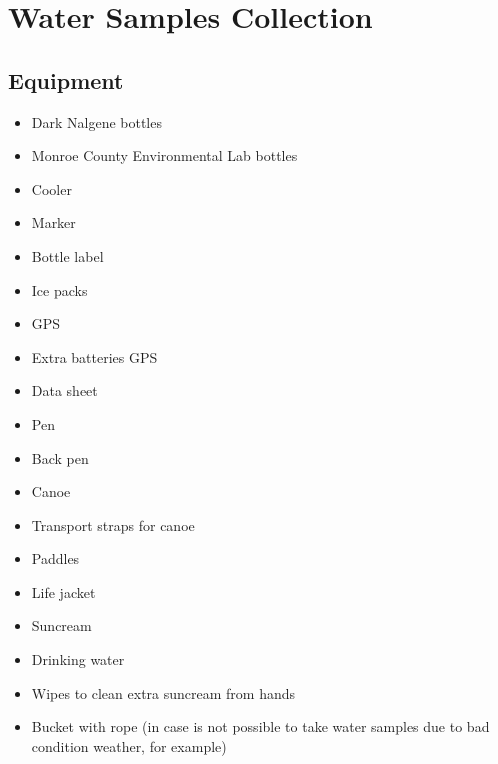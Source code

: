 \documentclass[]{spie}  %
\begin{document}
\section{Water Samples Collection}
\subsection{Equipment}

\begin{multicols}{3}
\begin{itemize}
  \item Dark Nalgene bottles
  \item Monroe County Environmental Lab bottles
  \item Cooler
  \item Marker
  \item Bottle label
  \item Ice packs
  \item GPS
  \item Extra batteries GPS
  \item Data sheet
  \item Pen
  \item Back pen
  \item Canoe 
  \item Transport straps for canoe
  \item Paddles
  \item Life jacket
  \item Suncream 
  \item Drinking water
  \item Wipes to clean extra suncream from hands
  \item Bucket with rope (in case is not possible to take water samples due to bad condition weather, for example)
\end{itemize}
\end{multicols}
\end{document}

